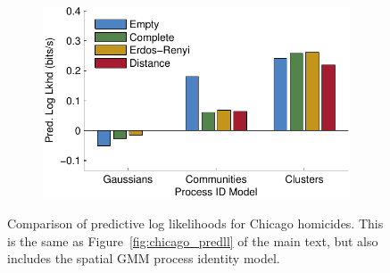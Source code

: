 \begin{figure}[!h]
  \begin{center}
    \begin{subfigure}[T]{.85\linewidth}
      \includegraphics[width=\linewidth]{figures/ch2/icpsr_pred_ll_gaussians}
    \end{subfigure}
  \end{center}
  \caption[Extended predictive log likelihood comparison for Gangs of
    Chicago]{Comparison of predictive log likelihoods for Chicago
    homicides. This is the same as Figure~\ref{fig:chicago_predll} of
    the main text, but also includes the spatial GMM process identity
    model.}
  \label{fig:chicago_pred_ll_gaussian}
\end{figure}


